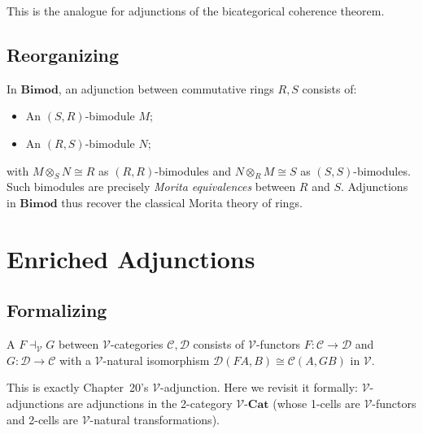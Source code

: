 This is the analogue for adjunctions of the bicategorical coherence theorem.

\subsection{Reorganizing}

\begin{example_thm}
In $\mathbf{Bimod}$, an adjunction between commutative rings $R, S$ consists
of:
\begin{itemize}
  \item An $(S, R)$-bimodule $M$;
  \item An $(R, S)$-bimodule $N$;
\end{itemize}
with $M \otimes_S N \cong R$ as $(R, R)$-bimodules and $N \otimes_R M \cong S$
as $(S, S)$-bimodules. Such bimodules are precisely \emph{Morita equivalences}
between $R$ and $S$. Adjunctions in $\mathbf{Bimod}$ thus recover the classical
Morita theory of rings.
\end{example_thm}


\section{Enriched Adjunctions}
\label{sec:enriched-adj}

\subsection{Formalizing}

\begin{definition}
\label{def:v-adjunction}
A  $F \dashv_\mathcal{V} G$ between
$\mathcal{V}$-categories $\mathcal{C}, \mathcal{D}$ consists of $\mathcal{V}$-functors
$F : \mathcal{C} \to \mathcal{D}$ and $G : \mathcal{D} \to \mathcal{C}$ with
a $\mathcal{V}$-natural isomorphism $\mathcal{D}(FA, B) \cong \mathcal{C}(A, GB)$
in $\mathcal{V}$.
\end{definition}

\begin{remark}
This is exactly Chapter~20's $\mathcal{V}$-adjunction. Here we revisit it
formally: $\mathcal{V}$-adjunctions are adjunctions in the 2-category
$\mathcal{V}$-$\mathbf{Cat}$ (whose 1-cells are $\mathcal{V}$-functors and
2-cells are $\mathcal{V}$-natural transformations).
\end{remark}

